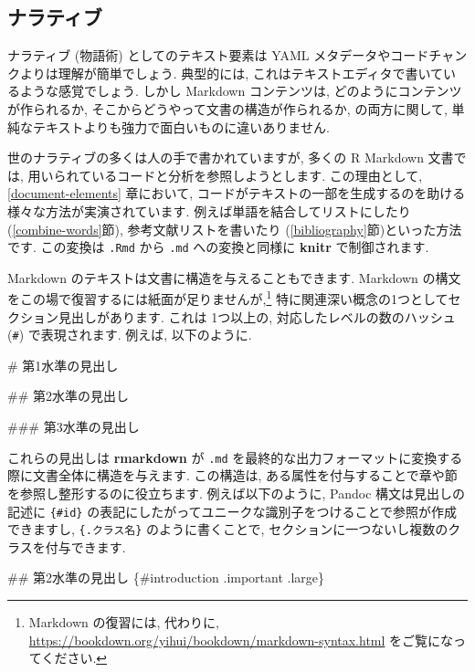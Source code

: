 \documentclass[
  11pt,
  lualatex,
  ja=standard]{bxjsreport}
\newenvironment{Shaded}{\begin{snugshade}}{\end{snugshade}}
\newcommand{\FunctionTok}[1]{\textcolor[rgb]{0.00,0.00,0.00}{#1}}
\begin{document}
\hypertarget{narrative}{%
\subsection{ナラティブ}\label{narrative}}

ナラティブ (物語術) としてのテキスト要素は YAML メタデータやコードチャンクよりは理解が簡単でしょう. 典型的には, これはテキストエディタで書いているような感覚でしょう. しかし Markdown コンテンツは, どのようにコンテンツが作られるか, そこからどうやって文書の構造が作られるか, の両方に関して, 単純なテキストよりも強力で面白いものに違いありません.

世のナラティブの多くは人の手で書かれていますが, 多くの R Markdown 文書では, 用いられているコードと分析を参照しようとします. この理由として, \ref{document-elements} 章において, コードがテキストの一部を生成するのを助ける様々な方法が実演されています. 例えば単語を結合してリストにしたり (\ref{combine-words}節), 参考文献リストを書いたり (\ref{bibliography}節)といった方法です. この変換は \texttt{.Rmd} から \texttt{.md} への変換と同様に \textbf{knitr} で制御されます.

Markdown のテキストは文書に構造を与えることもできます. Markdown の構文をこの場で復習するには紙面が足りませんが,\footnote{Markdown の復習には, 代わりに, \url{https://bookdown.org/yihui/bookdown/markdown-syntax.html} をご覧になってください.} 特に関連深い概念の1つとしてセクション見出しがあります. これは 1つ以上の, 対応したレベルの数のハッシュ (\texttt{\#}) で表現されます. 例えば, 以下のように.

\begin{Shaded}
\begin{Highlighting}[]
\FunctionTok{\# 第1水準の見出し}

\FunctionTok{\#\# 第2水準の見出し}

\FunctionTok{\#\#\# 第3水準の見出し}
\end{Highlighting}
\end{Shaded}

これらの見出しは \textbf{rmarkdown} が \texttt{.md} を最終的な出力フォーマットに変換する際に文書全体に構造を与えます. この構造は, ある属性を付与することで章や節を参照し整形するのに役立ちます. 例えば以下のように, Pandoc 構文は見出しの記述に \texttt{\{\#id\}} の表記にしたがってユニークな識別子をつけることで参照が作成できますし, \texttt{\{.クラス名\}} のように書くことで, セクションに一つないし複数のクラスを付与できます.

\begin{Shaded}
\begin{Highlighting}[]
\FunctionTok{\#\# 第2水準の見出し \{\#introduction .important .large\}}
\end{Highlighting}
\end{Shaded}
\end{document}
